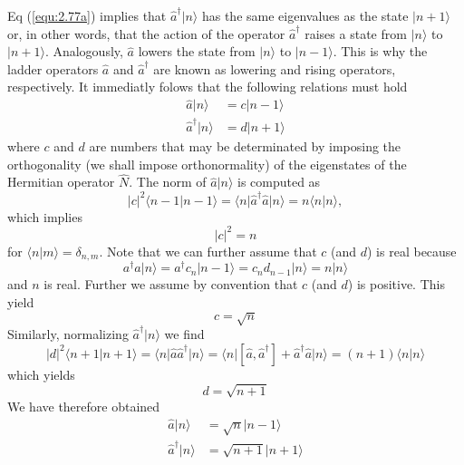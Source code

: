 Eq (\ref{equ:2.77a}) implies that $\hat{a}^{\dagger}\vert n\rangle $ has
the same eigenvalues as the state $\vert n+1\rangle $ or, in other
words, that the action of the operator $\hat{a}^{\dagger}$
raises a state from $\vert n\rangle $ to $\vert n+1\rangle $. Analogously, $\hat{a}$
lowers the state from $\vert n\rangle $ to $\vert n-1\rangle $. This is why the
ladder operators $\hat{a}$ and $\hat{a}^{\dagger}$ are known
as lowering and rising operators, respectively.
It immediatly folows that the following relations must hold
\begin{align}
  \hat{a}\vert n\rangle  &= c \vert n-1\rangle  \nonumber\\
  \hat{a}^{\dagger}\vert n\rangle  &= d \vert n+1\rangle  \label{equ:2.78}
\end{align}
where $c$ and $d$ are numbers that may be determinated by
imposing the orthogonality (we shall impose orthonormality)
of the eigenstates of the Hermitian operator $\hat{N}$. The
norm of $\hat{a}\vert n\rangle $ is computed as
$$
\vert c\vert ^2 \langle n-1\vert n-1\rangle  = \langle n\vert \hat{a}^{\dagger}\hat{a}\vert n\rangle  = n\langle n\vert n\rangle ,
$$
which implies
\begin{equation}
  \vert c\vert ^2 = n
  \label{equ:2.79}
\end{equation}
for $\langle n\vert m\rangle  = \delta_{n,m}$. Note that we can further assume
that $c$ (and $d$) is real because
$$
a^{\dagger}a \vert n\rangle  = a^{\dagger} c_n \vert  n-1\rangle  = c_n d_{n-1}\vert n\rangle  =
n\vert n\rangle 
$$
and $n$ is real. Further we assume by convention that $c$
(and $d$) is positive. This yield
\begin{equation}
  c = \sqrt{n}
  \label{equ:2.80}
\end{equation}
Similarly, normalizing $\hat{a}^{\dagger} \vert n\rangle $ we find
$$
\vert d\vert ^2 \langle n+1\vert n+1\rangle  = \langle n\vert \hat{a}\hat{a}^{\dagger}\vert n\rangle  =
\langle n\vert [\hat{a}, \hat{a}^{\dagger}] + \hat{a}^{\dagger}\hat{a} \vert 
n\rangle   = (n+1) \langle n\vert n\rangle 
$$
which yields
\begin{equation}
  d = \sqrt{n+1}
  \label{equ:2.81}
\end{equation}
We have therefore obtained
\begin{subequations}
  \begin{align}
    \hat{a}\vert n\rangle  &= \sqrt{n}\vert n-1\rangle  \label{equ:2.82a} \\
    \hat{a}^{\dagger}\vert n\rangle  &= \sqrt{n+1}\vert n+1\rangle  \label{equ:2.82b}
  \end{align}
\end{subequations}
